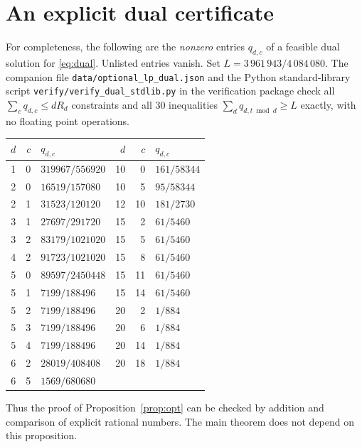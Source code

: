 \documentclass[11pt,a4paper]{article}
\begin{document}
\appendix
\section{An explicit dual certificate}\label{app:dual}
For completeness, the following are the \emph{nonzero} entries $q_{d,c}$ of a feasible dual solution for \eqref{eq:dual}. Unlisted entries vanish. Set $L=3\,961\,943/4\,084\,080$. The companion file \nolinkurl{data/optional_lp_dual.json} and the Python standard-library script \nolinkurl{verify/verify_dual_stdlib.py} in the verification package check all $\sum_{c}q_{d,c}\le dR_d$ constraints and all 30 inequalities $\sum_dq_{d,t\bmod d}\ge L$ exactly, with no floating point operations.
\vspace{0.2em}
\begin{center}\small
\begin{tabular}{@{}rrl@{\qquad\qquad}rrl@{}}\toprule
$d$&$c$&$q_{d,c}$ & $d$&$c$&$q_{d,c}$ \\ \midrule
1&0&$319967/556920$ & 10&0&$161/58344$ \\
2&0&$16519/157080$ & 10&5&$95/58344$ \\
2&1&$31523/120120$ & 12&10&$181/2730$ \\
3&1&$27697/291720$ & 15&2&$61/5460$ \\
3&2&$83179/1021020$ & 15&5&$61/5460$ \\
4&2&$91723/1021020$ & 15&8&$61/5460$ \\
5&0&$89597/2450448$ & 15&11&$61/5460$ \\
5&1&$7199/188496$ & 15&14&$61/5460$ \\
5&2&$7199/188496$ & 20&2&$1/884$ \\
5&3&$7199/188496$ & 20&6&$1/884$ \\
5&4&$7199/188496$ & 20&14&$1/884$ \\
6&2&$28019/408408$ & 20&18&$1/884$ \\
6&5&$1569/680680$ &  & &  \\
\bottomrule\end{tabular}\end{center}
\noindent Thus the proof of Proposition~\ref{prop:opt} can be checked by addition and comparison of explicit rational numbers. The main theorem does not depend on this proposition.
\end{document}
